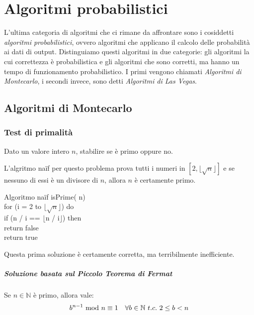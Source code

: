 \chapter{Algoritmi probabilistici}
L'ultima categoria di algoritmi che ci rimane da affrontare sono i
cosiddetti \emph{algoritmi probabilistici}, ovvero algoritmi che applicano
il calcolo delle probabilità ai dati di output. Distinguiamo questi
algoritmi in due categorie: gli algoritmi la cui correttezza è probabilistica
e gli algoritmi che sono corretti, ma hanno un tempo di funzionamento
probabilistico. I primi vengono chiamati \emph{Algoritmi di Montecarlo},
i secondi invece, sono detti \emph{Algoritmi di Las Vegas}.

\section{Algoritmi di Montecarlo}
\subsection{Test di primalità}
\begin{problem}
    Dato un valore intero $n$, stabilire se è primo oppure no.
\end{problem}

\noindent
L'algritmo naïf per questo problema prova tutti i numeri in $[2,\lfloor
\sqrt{n}\rfloor]$ e se nessuno di essi è un divisore di $n$, allora $n$
è certamente primo.

\begin{minicode}{Algoritmo naïf}
\ind{} isPrime( n)\\
    \indf for (i = 2 to $\lfloor\sqrt{n}\rfloor$) do\\
        \indff if (n / i == $\lfloor$n / i$\rfloor$) then\\
            return false\\
    \indf return true
\end{minicode}

\noindent
Questa prima soluzione è certamente corretta, ma terribilmente inefficiente.

\paragraph{Soluzione basata sul Piccolo Teorema di Fermat}
\begin{definition}
    Se $n\in\mathbb{N}$ è primo, allora vale:
    \[b^{n-1}\ \mathrm{mod}\ n\equiv 1\quad\forall b\in\mathbb{N}\ t.c.\ 2\leq b<n\]
\end{definition}

